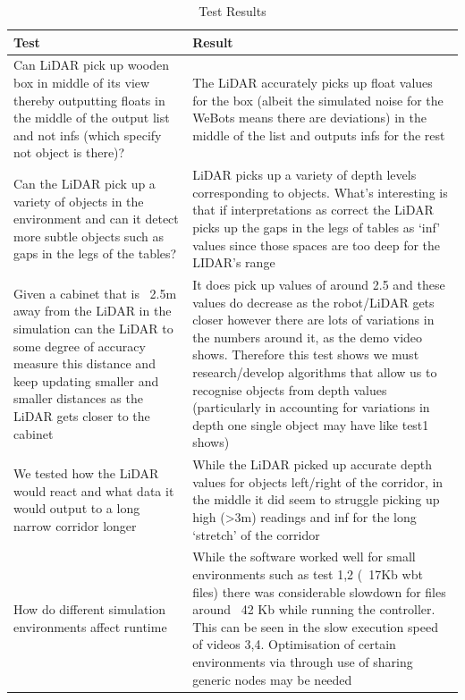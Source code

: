 \documentclass{article}
\begin{document}
\begin{table}[h]
\vskip 3mm
\begin{center}

\begin{small}

\begin{tabular}{|p{8.32cm}|p{8.35cm}|}
\hline\hline
\abovespace\belowspace
Test & Result    \\
\hline\hline
\abovespace
Can LiDAR pick up wooden box in middle of its
view thereby outputting floats in the middle of the output list and not infs (which specify not object is
there)?
& The LiDAR accurately picks up float values for the box (albeit the simulated noise for the WeBots means there are deviations) in the middle of the list and outputs infs for the rest  
 \belowspace\\
\hline
\abovespace
Can the LiDAR pick up a variety of objects in the environment and can it detect more subtle objects such as gaps in the legs of the tables?
 & LiDAR picks up a variety of depth levels
corresponding to objects. What’s interesting is that if interpretations as correct the LiDAR picks up the gaps in the legs of tables as ‘inf’ values since those spaces are too deep for the LIDAR’s range
\belowspace \\
\hline
\abovespace
Given a cabinet that is ~2.5m away from the LiDAR in the simulation can the LiDAR to some degree of accuracy measure this distance and keep updating smaller and smaller distances as the LiDAR gets closer to the cabinet
& It does pick up values of around 2.5 and these values do decrease as the robot/LiDAR gets closer however there are lots of variations in the numbers around it, as the demo video shows. Therefore this test shows we must research/develop algorithms that allow us to recognise objects from depth values (particularly in accounting for variations in
depth one single object may have like test1 shows)
 \belowspace \\
\hline
\abovespace
We tested how the LiDAR would react and what data it would output to a long narrow corridor longer
 & While the LiDAR picked up accurate depth values
for objects left/right of the corridor, in the middle it
did seem to struggle picking up high (>3m) readings
and inf for the long ‘stretch’ of the corridor
\belowspace \\
\hline
\abovespace
How do different simulation environments affect runtime
 & While the software worked well for small
environments such as test 1,2 (~17Kb wbt files)
there was considerable slowdown for files around
~42 Kb while running the controller. This can be
seen in the slow execution speed of videos 3,4.
Optimisation of certain environments via through
use of sharing generic nodes may be needed
\belowspace \\
\hline


\end{tabular}

\end{small}
\caption{Test Results}
\label{table 2}

\end{center}

\vskip -3mm
\end{table}
\end{document}
